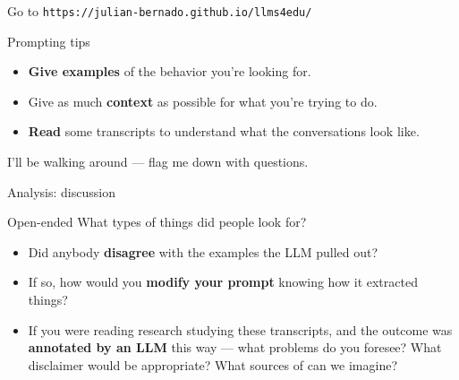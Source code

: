 \documentclass[aspectratio=169,t]{beamer}
\newcommand{\appurl}{\texttt{https://julian-bernado.github.io/llms4edu/}}
\begin{document}
\begin{frame}{}
    \begin{center}
        \Large Go to \appurl
    \end{center}
    \vspace{0.5em}
    \begin{block}{Prompting tips}
        \begin{itemize}
            \item \textbf{Give examples} of the behavior you're looking for.
            \item Give as much \textbf{context} as possible for what you're
                  trying to do.
            \item \textbf{Read} some transcripts to understand what the
                  conversations look like.
        \end{itemize}
    \end{block}
    \begin{center}
        \small I'll be walking around --- flag me down with questions.
    \end{center}
\end{frame}

\begin{frame}{Analysis: discussion}
    \begin{block}{Open-ended}
        What types of things did people look for?
    \end{block}
    \textbf{}
    \begin{itemize}
        \item Did anybody \textbf{disagree} with the examples the LLM pulled out?
        \item If so, how would you \textbf{modify your prompt} knowing how it
              extracted things?
        \item[$\rightarrow$] If you were reading research studying these
              transcripts, and the outcome was \textbf{annotated by an LLM} this
              way --- what problems do you foresee? What disclaimer would be
              appropriate? What sources of  can we
              imagine?
    \end{itemize}
\end{frame}
\end{document}
